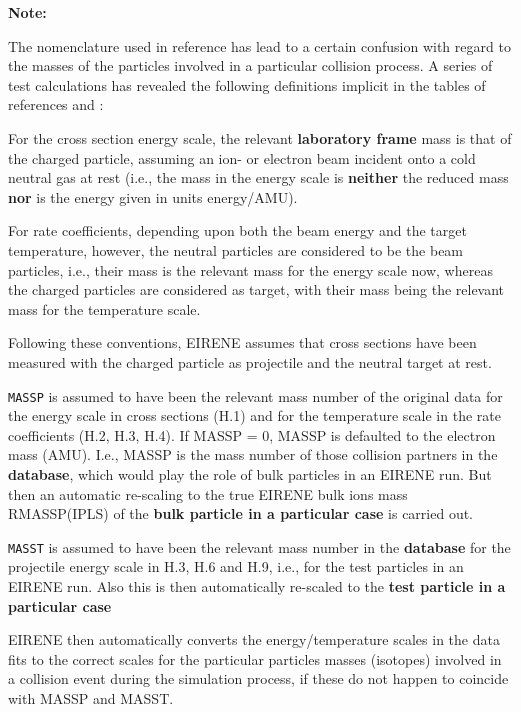 \bigskip

\textbf{Note:}

The nomenclature used in reference \cite{kn:Janev} has lead to a certain
confusion with regard to the masses of the particles involved in a particular
collision process.
A series of test calculations has revealed the following definitions implicit
in the tables of references \cite{kn:Janev} and \cite{kn:Ehrhardt}:

For the cross section energy scale, the relevant \textbf{laboratory frame} mass
is that of the charged particle, assuming an ion- or electron beam incident
onto a cold neutral gas at rest (i.e., the mass in the energy scale is
\textbf{neither} the reduced mass \textbf{nor} is the energy given in units
energy/\ac{AMU}).

For rate coefficients, depending upon both the beam energy and the target
temperature, however, the neutral particles are considered to be the beam
particles, i.e., their mass is the relevant mass for the energy scale now,
whereas the charged particles are considered as target, with their mass being
the relevant mass for the temperature scale.

Following these conventions, EIRENE assumes that cross sections have been
measured with the charged particle as projectile and the neutral target at
rest.

\textcolor[rgb]{1.00,0.00,0.00}{\texttt{MASSP}} is assumed to have been the
relevant
mass number of the original data for the energy scale in cross
sections (H.1) and for the temperature scale in the rate
coefficients (H.2, H.3, H.4).
If MASSP = 0, MASSP is defaulted to the electron mass (\ac{AMU}).
I.e., MASSP is the mass number of those collision partners in the
\textbf{database}, which would play the role of bulk particles in an EIRENE
run.
But then an automatic re-scaling to the true EIRENE bulk ions mass RMASSP(IPLS)
of the \textbf{bulk particle in a particular case} is carried out.

\textcolor[rgb]{1.00,0.00,0.00}{\texttt{MASST}} is assumed to have been the
relevant mass number in the \textbf{database}
for the
projectile energy scale in H.3, H.6 and H.9, i.e., for the test
particles in an EIRENE run.
Also this is then automatically re-scaled to the \textbf{test particle in a particular case}

EIRENE then automatically converts the energy/temperature scales in the data
fits to the correct scales for the particular particles masses (isotopes)
involved in a collision event during the simulation process, if these do not
happen to coincide with MASSP and MASST.

